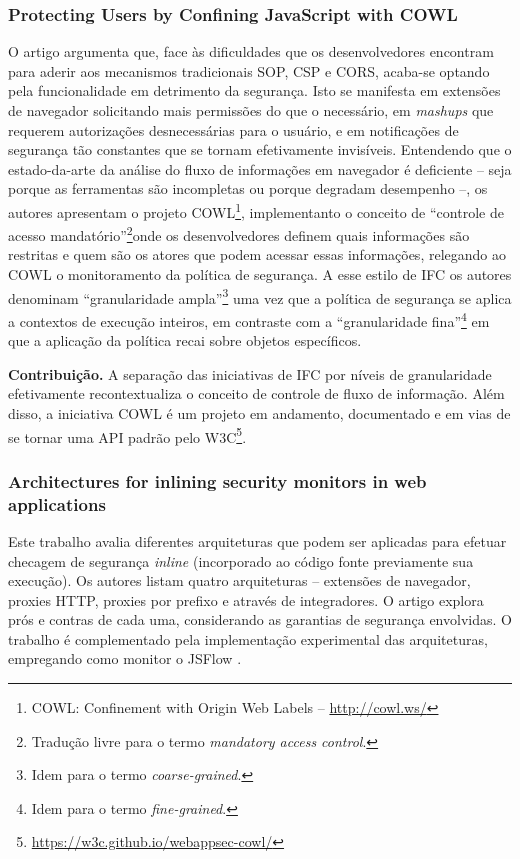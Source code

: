 \subsubsection{Protecting Users by Confining JavaScript with COWL \cite{Stefan2014}}
O artigo argumenta que, face às dificuldades que os desenvolvedores encontram para aderir aos mecanismos tradicionais SOP, CSP e CORS, acaba-se optando pela funcionalidade em detrimento da segurança. Isto se manifesta em extensões de navegador solicitando mais permissões do que o necessário, em \textit{mashups} que requerem autorizações desnecessárias para o usuário, e em notificações de segurança tão constantes que se tornam efetivamente invisíveis. Entendendo que o estado-da-arte da análise do fluxo de informações em navegador é deficiente -- seja porque as ferramentas são incompletas ou porque degradam desempenho --, os autores apresentam o projeto COWL\footnote{COWL: Confinement with Origin Web Labels -- \url{http://cowl.ws/}}, implementanto o conceito de ``controle de acesso mandatório''\footnote{Tradução livre para o termo \textit{mandatory access control}.}onde os desenvolvedores definem quais informações são restritas e quem são os atores que podem acessar essas informações, relegando ao COWL o monitoramento da política de segurança. A esse estilo de IFC os autores denominam ``granularidade ampla''\footnote{Idem para o termo \textit{coarse-grained}.} uma vez que a política de segurança se aplica a contextos de execução inteiros, em contraste com a ``granularidade fina''\footnote{Idem para o termo \textit{fine-grained}.} em que a aplicação da política recai sobre objetos específicos.

\textbf{Contribuição.} A separação das iniciativas de IFC por níveis de granularidade efetivamente recontextualiza o conceito de controle de fluxo de informação. Além disso, a iniciativa COWL é um projeto em andamento, documentado e em vias de se tornar uma API padrão pelo W3C\footnote{\url{https://w3c.github.io/webappsec-cowl/}}.


\subsubsection{Architectures for inlining security monitors in web applications \cite{Magazinius2014}}
Este trabalho avalia diferentes arquiteturas que podem ser aplicadas para efetuar checagem de segurança \textit{inline} (incorporado ao código fonte previamente sua execução). Os autores listam quatro arquiteturas -- extensões de navegador, proxies HTTP, proxies por prefixo e através de integradores.
O artigo explora prós e contras de cada uma, considerando as garantias de segurança envolvidas. O trabalho é complementado pela implementação experimental das arquiteturas, empregando como monitor o JSFlow \cite{Hedin2014}.

